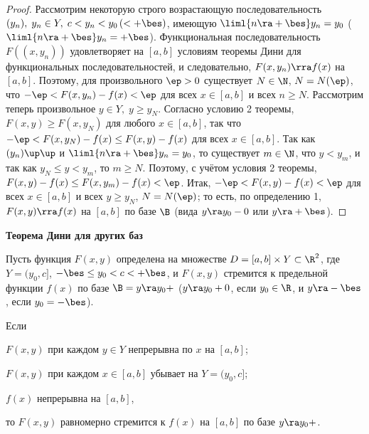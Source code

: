 \documentclass[a4paper]{article}
\begin{document}
\begin{proof}
Рассмотрим некоторую строго возрастающую последовательность $(y_n),
\; y_n\in Y, \; c<y_n<y_0 \, (<+\bes)$, имеющую $\liml{n\ra+\bes}
y_n=y_0$ ($\liml{n\ra+\bes}y_n=+\bes$). Функциональная
последовательность $F((x,y_n))$ удовлетворяет на $[a,b]$ условиям
теоремы Дини для функциональных последовательностей, и
следовательно, $F(x,y_n)\rra f(x)$ на $[a,b]$. Поэтому, для
произвольного $\ep>0$ существует $N\in\N$, $N=N(\ep)$, что
$-\ep<F(x,y_n) - f(x)<\ep$ для всех $x\in[a,b]$ и всех $n\ge N$.
Рассмотрим теперь произвольное $y\in Y, \; y\ge y_N$. Согласно
условию 2 теоремы, $F(x,y) \ge F(x,y_N)$ для любого $x\in[a,b]$, так
что $-\ep<F(x,y_N)-f(x)\le F(x,y)-f(x)$ для всех $x\in[a,b]$. Так
как $(y_n)\up\up$ и $\liml{n\ra+\bes} y_n = y_0$, то существует
$m\in\N$, что $y<y_m$, и так как $y_N\le y < y_m$, то $m\ge N$.
Поэтому, с учётом условия 2 теоремы, $F(x,y)-f(x) \le F(x,y_m) -
f(x) < \ep$. Итак, $-\ep< F(x,y) - f(x)<\ep$ для всех $x\in[a,b]$ и
всех $y\ge y_N$, $N=N(\ep)$; то есть, по определению 1, $F(x,y)\rra
f(x)$ на $[a,b]$ по базе $\B$ (вида $y\ra y_0-0$ или $y\ra+\bes$).
\end{proof}

\begin{center}\textbf{Теорема Дини для других баз}\end{center}
\begin{theorem}
Пусть функция $F(x,y)$ определена на множестве $D=[a,b]\times
Y\subset \R^2$, где $Y=(y_0,c]$, $-\bes\le y_0 < c < +\bes$, и
$F(x,y)$ стремится к предельной функции $f(x)$ по базе $\B=y\ra
y_0+$ ($y\ra y_0+0$, если $y_0\in\R$, и $y\ra -\bes$, если
$y_0=-\bes$).

Если \begin{nums}{-2} \item $F(x,y)$ при каждом $y\in Y$ непрерывна
по $x$ на $[a,b]$; \item $F(x,y)$ при каждом $x\in[a,b]$ убывает на
$Y=(y_0,c]$; \item $f(x)$ непрерывна на $[a,b]$,\end{nums} то
$F(x,y)$ равномерно стремится к $f(x)$ на $[a,b]$ по базе $y\ra
y_0+$.
\end{theorem}
\end{document}
